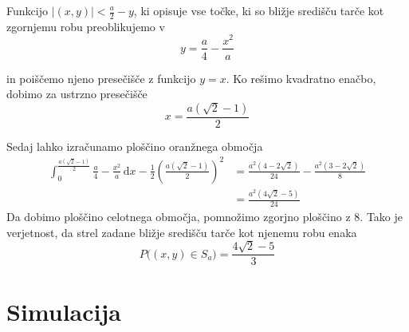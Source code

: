 \documentclass{amsart}
\theoremstyle{definition} %
\theoremstyle{plain} %
\begin{document}
Funkcijo $|(x,y)| < \frac{a}{2} - y$, ki opisuje vse točke, ki so bližje središču tarče kot
zgornjemu robu preoblikujemo v 
\begin{equation*}
    y = \frac{a}{4} - \frac{x^2}{a}
\end{equation*}

in poiščemo njeno presečišče z funkcijo $y = x$. Ko rešimo kvadratno enačbo,
dobimo za ustrzno presečišče
\begin{equation*}
    x=\frac{a(\sqrt{2}-1)}{2}
\end{equation*}

Sedaj lahko izračunamo ploščino oranžnega območja
\begin{align*}
    \int_{0}^{\frac{a(\sqrt{2}-1)}{2}} \frac{a}{4} - \frac{x^2}{a} \, \mathrm{d}x - \frac{1}{2}(\frac{a(\sqrt{2}-1)}{2})^2
    &= \frac{a^2(4-2\sqrt{2})}{24} - \frac{a^2(3-2\sqrt{2})}{8} \\
    &= \frac{a^2(4\sqrt{2}-5)}{24}
\end{align*}
Da dobimo ploščino celotnega območja, pomnožimo zgorjno ploščino z $8$. Tako je verjetnost, da strel zadane bližje središču
tarče kot njenemu robu enaka
\begin{equation*}
    P\big((x,y) \in S_a\big) = \frac{4\sqrt{2}-5}{3}
\end{equation*}

\pagebreak

\section{Simulacija}
\end{document}
